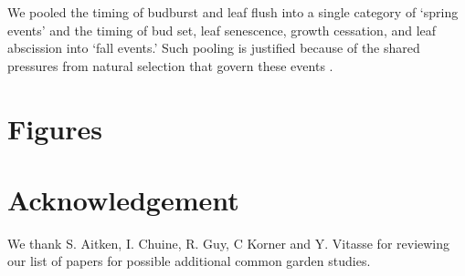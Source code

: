 \documentclass{article}
\begin{document}
We pooled the timing of budburst and leaf flush into a single category of ‘spring events’ and the timing of bud set, leaf senescence, growth cessation, and leaf abscission into ‘fall events.’ Such pooling is justified because of the shared pressures from natural selection that govern these events \citep{Gill15}. 





\section{Figures}







\section{Acknowledgement}
We thank S. Aitken,  I. Chuine, R. Guy, C Korner and Y. Vitasse for reviewing our list of papers for possible additional common garden studies. 
\end{document}
